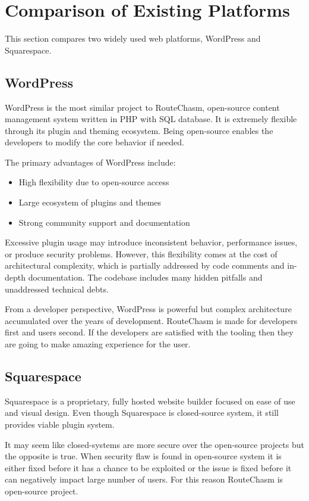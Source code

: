 \section{Comparison of Existing Platforms}\label{sec:comparison-of-existing-platforms}
This section compares two widely used web platforms, WordPress and Squarespace.

\subsection{WordPress}\label{subsec:wordpress}
WordPress is the most similar project to RouteChasm, open-source content management system written in PHP with SQL database.
It is extremely flexible through its plugin and theming ecosystem.
Being open-source enables the developers to modify the core behavior if needed.

The primary advantages of WordPress include:

\begin{itemize}
    \item High flexibility due to open-source access
    \item Large ecosystem of plugins and themes
    \item Strong community support and documentation
\end{itemize}

Excessive plugin usage may introduce inconsistent behavior, performance issues, or produce security problems.
However, this flexibility comes at the cost of architectural complexity, which is partially addressed by code comments
and in-depth documentation.
The codebase includes many hidden pitfalls and unaddressed technical debts.

From a developer perspective, WordPress is powerful but complex architecture accumulated over the years of development.
RouteChasm is made for developers first and users second.
If the developers are satisfied with the tooling then they are going to make amazing experience for the user.

\subsection{Squarespace}\label{subsec:squarespace}
Squarespace is a proprietary, fully hosted website builder focused on ease of use and visual design.
Even though Squarespace is closed-source system, it still provides viable plugin system.

It may seem like closed-systems are more secure over the open-source projects but the opposite is true.
When security flaw is found in open-source system it is either fixed before it has a chance to be exploited
or the issue is fixed before it can negatively impact large number of users.
For this reason RouteChasm is open-source project.


